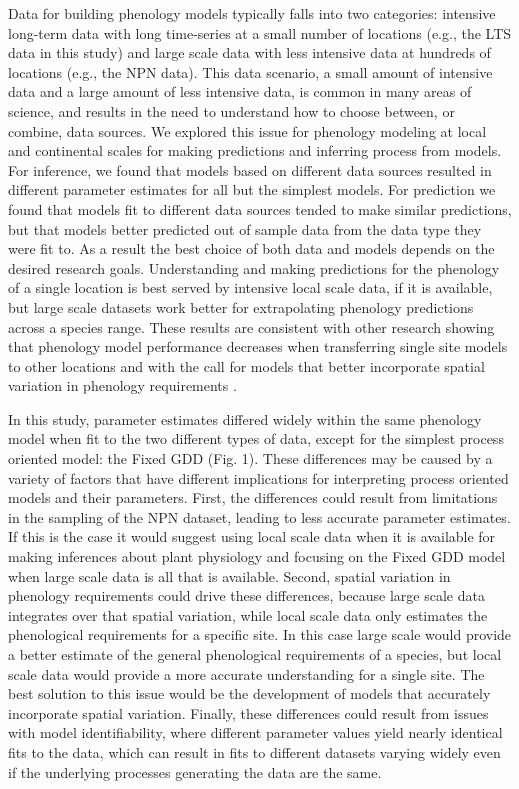 \documentclass[fleqn,10pt,lineno]{wlpeerj} %
\begin{document}
Data for building phenology models typically falls into two categories: intensive long-term data with long time-series at a small number of locations (e.g., the LTS data in this study) and large scale data with less intensive data at hundreds of locations (e.g., the NPN data). This data scenario, a small amount of intensive data and a large amount of less intensive data, is common in many areas of science, and results in the need to understand how to choose between, or combine, data sources. We explored this issue for phenology modeling at local and continental scales for making predictions and inferring process from models. For inference, we found that models based on different data sources resulted in different parameter estimates for all but the simplest models. For prediction we found that models fit to different data sources tended to make similar predictions, but that models better predicted out of sample data from the data type they were fit to. As a result the best choice of both data and models depends on the desired research goals. Understanding and making predictions for the phenology of a single location is best served by intensive local scale data, if it is available, but large scale datasets work better for extrapolating phenology predictions across a species range. These results are consistent with other research showing that phenology model performance decreases when transferring single site models to other locations \citep{garcia-mozo2008, xu2013, basler2016} and with the call for models that better incorporate spatial variation in phenology requirements \citep{richardson2013, chuine2017}.

In this study, parameter estimates differed widely within the same phenology model when fit to the two different types of data, except for the simplest process oriented model: the Fixed GDD (Fig. 1). These differences may be caused by a variety of factors that have different implications for interpreting process oriented models and their parameters. First, the differences could result from limitations in the sampling of the NPN dataset, leading to less accurate parameter estimates. If this is the case it would suggest using local scale data when it is available for making inferences about plant physiology and focusing on the Fixed GDD model when large scale data is all that is available. Second, spatial variation in phenology requirements could drive these differences, because large scale data integrates over that spatial variation, while local scale data only estimates the phenological requirements for a specific site. In this case large scale would provide a better estimate of the general phenological requirements of a species, but local scale data would provide a more accurate understanding for a single site. The best solution to this issue would be the development of models that accurately incorporate spatial variation. Finally, these differences could result from issues with model identifiability, where different parameter values yield nearly identical fits to the data, which can result in fits to different datasets varying widely even if the underlying processes generating the data are the same.
\end{document}

